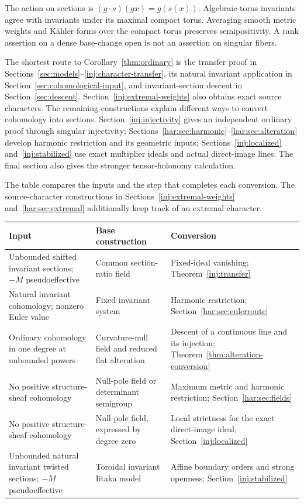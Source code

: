 The action on sections is $(g\cdot s)(gx)=g(s(x))$. Algebraic-torus invariants agree with invariants under its maximal compact torus. Averaging smooth metric weights and K\"ahler forms over the compact torus preserves semipositivity. A rank assertion on a dense base-change open is not an assertion on singular fibers.

The shortest route to Corollary~\ref{thm:ordinary} is the transfer proof in Sections~\ref{sec:models}--\ref{inj:character-transfer}, its natural invariant application in Section~\ref{sec:cohomological-input}, and invariant-section descent in Section~\ref{sec:descent}. Section~\ref{inj:extremal-weights} also obtains exact source characters. The remaining constructions explain different ways to convert cohomology into sections. Section~\ref{inj:injectivity} gives an independent ordinary proof through singular injectivity; Sections~\ref{har:sec:harmonic}--\ref{har:sec:alteration} develop harmonic restriction and its geometric inputs; Sections~\ref{inj:localized} and~\ref{inj:stabilized} use exact multiplier ideals and actual direct-image lines. The final section also gives the stronger tensor-holonomy calculation.

The table compares the inputs and the step that completes each conversion. The source-character constructions in Sections~\ref{inj:extremal-weights} and~\ref{har:sec:extremal} additionally keep track of an extremal character.
\begin{center}
\small
\begin{tabular}{@{}>{\raggedright\arraybackslash}p{}>{\raggedright\arraybackslash}p{}>{\raggedright\arraybackslash}p{}@{}}
\toprule
Input & Base construction & Conversion \\
\midrule
Unbounded shifted invariant sections; $-M$ pseudoeffective & Common section-ratio field & Fixed-ideal vanishing; Theorem~\ref{inj:transfer} \\
Natural invariant cohomology; nonzero Euler value & Fixed invariant system & Harmonic restriction; Section~\ref{har:sec:eulerroute} \\
Ordinary cohomology in one degree at unbounded powers & Curvature-null field and reduced flat alteration & Descent of a continuous line and its injection; Theorem~\ref{thm:alteration-conversion} \\
No positive structure-sheaf cohomology & Null-pole field or determinant semigroup & Maximum metric and harmonic restriction; Section~\ref{har:sec:fields} \\
No positive structure-sheaf cohomology & Null-pole field, expressed by degree zero & Local strictness for the exact direct-image ideal; Section~\ref{inj:localized} \\
Unbounded natural invariant twisted sections; $-M$ pseudoeffective & Toroidal invariant Iitaka model & Affine boundary orders and strong openness; Section~\ref{inj:stabilized} \\
\bottomrule
\end{tabular}
\end{center}
